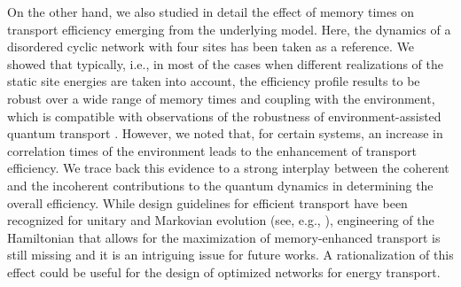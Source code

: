 \documentclass[12pt, amsmath, amssymb, graphicx]{iopart}
\begin{document}
On the other hand, we also studied in detail the effect of memory times on transport efficiency emerging from the underlying model. Here, the dynamics of a disordered cyclic network with four sites has been taken as a reference. We showed that typically, i.e., in most of the cases when different realizations of the static site energies are taken into account, the efficiency profile results to be robust over a wide range of memory times and coupling with the environment, which is compatible with observations of the robustness of environment-assisted quantum transport \cite{Mohseni2014}.
However, we noted that, for certain systems, an increase in correlation times of the environment leads to the enhancement of transport efficiency.
We trace back this evidence to a strong interplay between the coherent and the incoherent contributions to the quantum dynamics in determining the overall efficiency. While design guidelines for efficient transport have been recognized for unitary and Markovian evolution (see, e.g., \cite{Mattiotti2022, Zech2014}), engineering of the Hamiltonian that allows for the maximization of memory-enhanced transport is still missing and it is an intriguing issue for future works.
A rationalization of this effect could be useful for the design of optimized networks for energy transport.
\end{document}
